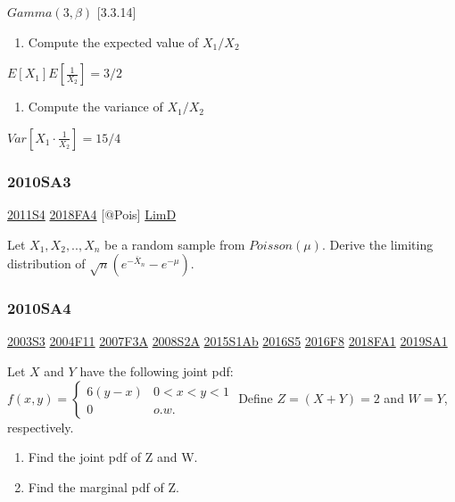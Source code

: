 \documentclass[10pt,twocolumn,portrait]{article}
\providecommand{\tightlist}{%
  \setlength{\itemsep}{0pt}\setlength{\parskip}{0pt}}
\begin{document}
\(Gamma(3,\beta)\) {[}3.3.14{]}

\begin{enumerate}
\def\labelenumi{(\alph{enumi})}
\tightlist
\item
  Compute the expected value of \(X_1/X_2\)
\end{enumerate}

\(E[X_1]E[\frac1{X_2}]=3/2\)

\begin{enumerate}
\def\labelenumi{(\alph{enumi})}
\setcounter{enumi}{1}
\tightlist
\item
  Compute the variance of \(X_1/X_2\)
\end{enumerate}

\(Var[X_1\cdot\frac1{X_2}]=15/4\)

\hypertarget{sa3-1}{%
\subsubsection{2010SA3}\label{sa3-1}}

\protect\hyperlink{s4-2}{2011S4} \protect\hyperlink{fa4-4}{2018FA4}
{[}@Pois{]} \protect\hyperlink{LimD}{LimD}

Let \(X_1,X_2,..,X_n\) be a random sample from \(Poisson(\mu)\). Derive
the limiting distribution of \(\sqrt{n}(e^{-\bar X_n}-e^{-\mu})\).

\hypertarget{sa4-1}{%
\subsubsection{2010SA4}\label{sa4-1}}

\protect\hyperlink{s3}{2003S3} \protect\hyperlink{f11}{2004F11}
\protect\hyperlink{f3a}{2007F3A} \protect\hyperlink{s2a}{2008S2A}
\protect\hyperlink{s1ab}{2015S1Ab} \protect\hyperlink{s5-4}{2016S5}
\protect\hyperlink{f8-4}{2016F8} \protect\hyperlink{fa1-4}{2018FA1}
\protect\hyperlink{sa1-3}{2019SA1}

Let \(X\) and \(Y\) have the following joint pdf:
\(f(x,y) =\begin{cases}6(y-x)& 0<x<y<1\\0& o.w.\end{cases}\) Define
\(Z=(X+Y)=2\) and \(W=Y\), respectively.

\begin{enumerate}
\def\labelenumi{(\alph{enumi})}
\item
  Find the joint pdf of Z and W.
\item
  Find the marginal pdf of Z.
\end{enumerate}
\end{document}
